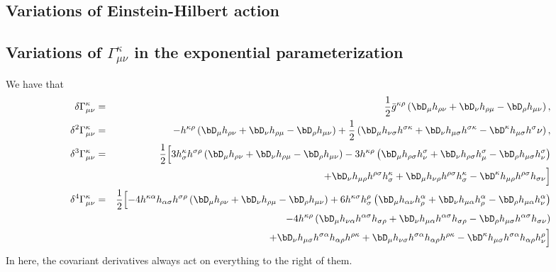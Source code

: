 \documentclass[11pt]{book} %
\newcommand{\bea}{\begin{eqnarray}}
\newcommand{\eea}{\end{eqnarray}}
\numberwithin{equation}{chapter}
\begin{document}
{\begin{appendices}
\chapter{Variations of Einstein-Hilbert action}

\section{Variations of $\Gamma_{\mu \nu}^{\kappa}$ in the exponential parameterization}

We have that
\bea
\delta \Gamma_{\mu \nu}^{\kappa} &=& \frac{1}{2}\bar{g}^{\kappa \rho} \left(\bD_{\mu}h_{\rho \nu}+ \bD_{\nu}h_{\rho \mu} - \bD_{\rho}h_{\mu \nu} \right),\\
%
\delta^2 \Gamma_{\mu \nu}^{\kappa} &=&-h^{\kappa \rho}\left(\bD_{\mu}h_{\rho \nu}+ \bD_{\nu}h_{\rho \mu} - \bD_{\rho}h_{\mu \nu} \right)+ \frac{1}{2}\left(\bD_{\mu}h_{\nu\sigma}h^{\sigma \kappa} + \bD_{\nu} h_{\mu \sigma}h^{\sigma \kappa} - \bD^{\kappa}h_{\mu \sigma}h^{\sigma}{\nu} \right),\\
%
\delta^3 \Gamma_{\mu \nu}^{\kappa} &=&\frac{1}{2}\Bigl[ 3 h^{\kappa}_{\sigma} h^{\sigma \rho}\left(\bD_{\mu}h_{\rho \nu}+ \bD_{\nu}h_{\rho \mu} - \bD_{\rho}h_{\mu \nu} \right) -3 h^{\kappa \rho} \left(\bD_{\mu}h_{\rho \sigma}h^{\sigma}_{\nu}+ \bD_{\nu}h_{\rho \sigma}h^{\sigma}_{\mu} - \bD_{\rho}h_{\mu \sigma}h^{\sigma}_{\nu} \right)\nonumber\\
&{}& +\bD_{\nu}h_{\mu \rho}h^{\rho \sigma}h_{\sigma}^{\kappa} + \bD_{\mu}h_{\nu \rho}h^{\rho \sigma}h_{\sigma}^{\kappa}- \bD^{\kappa}h_{\mu \rho}h^{\rho \sigma}h_{\sigma\nu}\Bigr]\\
\delta^4 \Gamma_{\mu \nu}^{\kappa}&=& \frac{1}{2}\Bigl[ - 4 h^{\kappa \alpha}h_{\alpha \sigma}h^{\sigma \rho}\left(\bD_{\mu}h_{\rho \nu}+ \bD_{\nu}h_{\rho \mu} - \bD_{\rho}h_{\mu \nu} \right) + 6 h^{\kappa \sigma}h_{\sigma}^{\rho} \left( \bD_{\mu}h_{\alpha \nu}h^{\alpha}_{\rho} +\bD_{\nu} h_{\mu \alpha}h^{\alpha}_{\rho} - \bD_{\rho}h_{\mu \alpha}h^{\alpha}_{\nu}\right)\nonumber\\
&{}& - 4h^{\kappa \rho}\left( \bD_{\mu}h_{\nu \alpha}h^{\alpha \sigma}h_{\sigma\rho} + \bD_{\nu}h_{\mu \alpha}h^{\alpha \sigma}h_{\sigma\rho}- \bD_{\rho}h_{\mu \sigma}h^{\alpha \sigma}h_{\sigma \nu} \right) \nonumber\\
&{}&+ \bD_{\nu}h_{\mu \sigma}h^{\sigma \alpha}h_{\alpha\rho}h^{\rho \kappa}+\bD_{\mu}h_{\nu \sigma}h^{\sigma \alpha}h_{\alpha\rho}h^{\rho \kappa} - \bD^{\kappa}h_{\mu \sigma}h^{\sigma \alpha}h_{\alpha \rho}h^{\rho}_{\nu}\Bigr]
\eea
In here, the covariant derivatives always act on everything to the right of them.


\end{appendices}}
\end{document}
